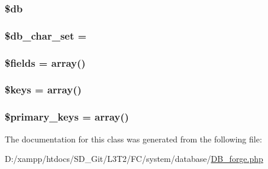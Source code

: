 \subsubsection[{\$db}]{\setlength{\rightskip}{0pt plus 5cm}\$db\hspace{0.3cm}{\ttfamily [protected]}}\label{class_c_i___d_b__forge_a1fa3127fc82f96b1436d871ef02be319}
\hypertarget{class_c_i___d_b__forge_a6e90c3633cd0984a7e8de501f7771c53}{}
\subsubsection[{\$db\+\_\+char\+\_\+set}]{\setlength{\rightskip}{0pt plus 5cm}\$db\+\_\+char\+\_\+set = \textquotesingle{}\textquotesingle{}}\label{class_c_i___d_b__forge_a6e90c3633cd0984a7e8de501f7771c53}
\hypertarget{class_c_i___d_b__forge_ab2303c817e3b402b77b7f99627b9c319}{}
\subsubsection[{\$fields}]{\setlength{\rightskip}{0pt plus 5cm}\$fields = array()}\label{class_c_i___d_b__forge_ab2303c817e3b402b77b7f99627b9c319}
\hypertarget{class_c_i___d_b__forge_af20635b6c08e03bfee9e3fc036fa80f3}{}
\subsubsection[{\$keys}]{\setlength{\rightskip}{0pt plus 5cm}\$keys = array()}\label{class_c_i___d_b__forge_af20635b6c08e03bfee9e3fc036fa80f3}
\hypertarget{class_c_i___d_b__forge_a09349689030ba7198a094abf357c78bc}{}
\subsubsection[{\$primary\+\_\+keys}]{\setlength{\rightskip}{0pt plus 5cm}\$primary\+\_\+keys = array()}\label{class_c_i___d_b__forge_a09349689030ba7198a094abf357c78bc}


The documentation for this class was generated from the following file\+:\begin{DoxyCompactItemize}
\item 
D\+:/xampp/htdocs/\+S\+D\+\_\+\+Git/\+L3\+T2/\+F\+C/system/database/\hyperlink{_d_b__forge_8php}{D\+B\+\_\+forge.\+php}\end{DoxyCompactItemize}
